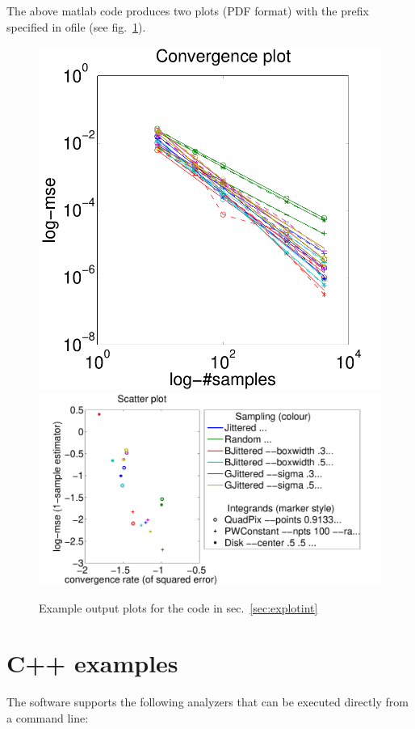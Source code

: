 The above matlab code produces two plots (PDF format) with the prefix specified in ofile (see fig.~\ref{fig:explotint}). 
\begin{figure}[htbp]
\includegraphics[width=0.36\linewidth]{figs/test-convs.pdf} 
\includegraphics[width=0.64\linewidth]{figs/test-scatter.pdf}
\caption{\label{fig:explotint} Example output plots for the code in sec.~\ref{sec:explotint}}
\end{figure}



\section{C++ examples}

The software supports the following analyzers that can be executed directly from a command line:

